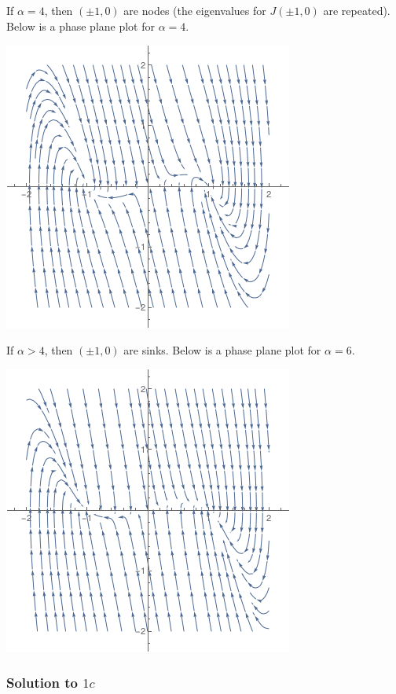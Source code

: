 If $\alpha = 4$, then $(\pm 1, 0)$ are nodes (the eigenvalues for $J(\pm 1, 0)$ are repeated). Below is a phase plane plot for $\alpha = 4$.
\begin{center}
\includegraphics[scale=0.75]{./_Figures/f1312.png}
\end{center}

If $\alpha > 4$, then $(\pm 1, 0)$ are sinks. Below is a phase plane plot for $\alpha = 6$.
\begin{center}
\includegraphics[scale=0.75]{./_Figures/f1313.png}
\end{center}

\subsubsection*{Solution to $1c$}

